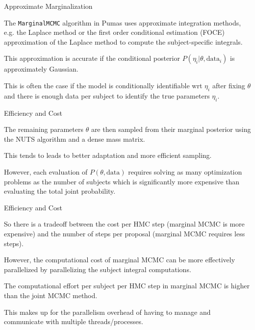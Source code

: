 \begin{frame}{Approximate Marginalization}
	\begin{vfilleditems}
		\item The \lstinline{MarginalMCMC} algorithm in Pumas uses approximate integration methods, e.g. the Laplace method or the first order conditional estimation (FOCE) approximation of the Laplace method to compute the subject-specific integrals.
		\item This approximation is accurate if the conditional posterior $P(\eta_i | \theta, \text{data}_i)$ is approximately Gaussian.
		\item This is often the case if the model is conditionally identifiable wrt $\eta_i$ after fixing $\theta$ and there is enough data per subject to identify the true parameters $\eta_i$.
	\end{vfilleditems}
\end{frame}

\begin{frame}{Efficiency and Cost}
	\begin{vfilleditems}
		\item The remaining parameters $\theta$ are then sampled from their marginal posterior using the NUTS algorithm and a dense mass matrix.
		\item This tends to leads to better adaptation and more efficient sampling.
		\item However, each evaluation of $P(\theta, \text{data})$ requires solving as many optimization problems as the number of subjects which is significantly more expensive than evaluating the total joint probability.
	\end{vfilleditems}
\end{frame}

\begin{frame}{Efficiency and Cost}
	\begin{vfilleditems}
		\item So there is a tradeoff between the cost per HMC step (marginal MCMC is more expensive) and the number of steps per proposal (marginal MCMC requires less steps).
		\item However, the computational cost of marginal MCMC can be more effectively parallelized by parallelizing the subject integral computations.
		\item The computational effort per subject per HMC step in marginal MCMC is higher than the joint MCMC method.
		\item This makes up for the parallelism overhead of having to manage and communicate with multiple threads/processes.
	\end{vfilleditems}
\end{frame}

